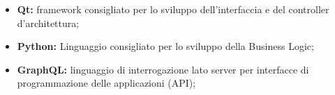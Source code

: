 \begin{itemize}
\item {\bf Qt:} framework consigliato per lo sviluppo
dell'interfaccia e del controller d’architettura;
\item {\bf Python:} Linguaggio consigliato per lo sviluppo della Business Logic;
\item {\bf GraphQL:} linguaggio di interrogazione lato server per interfacce di programmazione delle applicazioni (API);
\end{itemize}